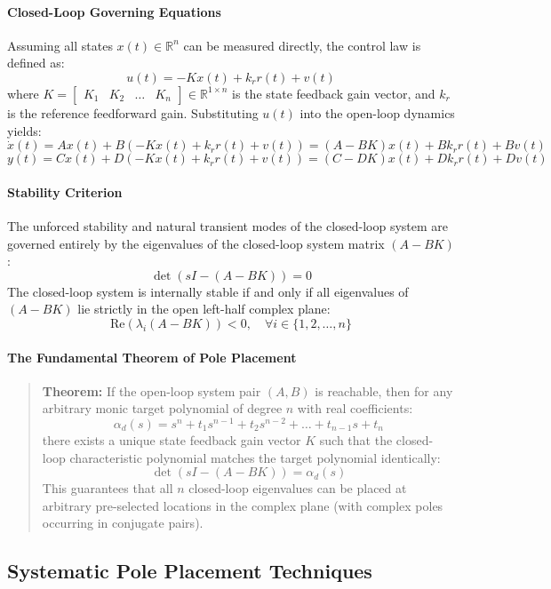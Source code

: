 \documentclass[12pt,onecolumn,twoside ]{article}
\begin{document}
	\paragraph{Closed-Loop Governing Equations}
	Assuming all states $x(t) \in \mathbb{R}^n$ can be measured directly, the control law is defined as: \[
	u(t) = -Kx(t) + k_r r(t) + v(t)
	\] where $K = \begin{bmatrix} K_1 & K_2 & \dots & K_n \end{bmatrix} \in \mathbb{R}^{1 \times n}$ is the state feedback gain vector, and $k_r$ is the reference feedforward gain.
	Substituting $u(t)$ into the open-loop dynamics yields: \[
	\dot{x}(t) = Ax(t) + B\left( -Kx(t) + k_r r(t) + v(t) \right) = (A - BK)x(t) + B k_r r(t) + B v(t)
	\] \[
	y(t) = Cx(t) + D\left( -Kx(t) + k_r r(t) + v(t) \right) = (C - DK)x(t) + D k_r r(t) + D v(t)
	\]
	\paragraph{Stability Criterion}
	The unforced stability and natural transient modes of the closed-loop system are governed entirely by the eigenvalues of the closed-loop system matrix $(A - BK)$: \[
	\det(sI - (A - BK)) = 0
	\] The closed-loop system is internally stable if and only if all eigenvalues of $(A - BK)$ lie strictly in the open left-half complex plane: \[
	\text{Re}(\lambda_i(A - BK)) < 0, \quad \forall i \in \{1, 2, \dots, n\}
	\]
	\paragraph{The Fundamental Theorem of Pole Placement}
	\begin{quote}
		\textbf{Theorem:} If the open-loop system pair $(A, B)$ is reachable, then for any arbitrary monic target polynomial of degree $n$ with real coefficients: \[
		\alpha_d(s) = s^n + t_1 s^{n-1} + t_2 s^{n-2} + \dots + t_{n-1}s + t_n
		\] there exists a unique state feedback gain vector $K$ such that the closed-loop characteristic polynomial matches the target polynomial identically: \[
		\det(sI - (A - BK)) = \alpha_d(s)
		\] This guarantees that all $n$ closed-loop eigenvalues can be placed at arbitrary pre-selected locations in the complex plane (with complex poles occurring in conjugate pairs).
	\end{quote}
	
	\subsection{Systematic Pole Placement Techniques}
\end{document}
